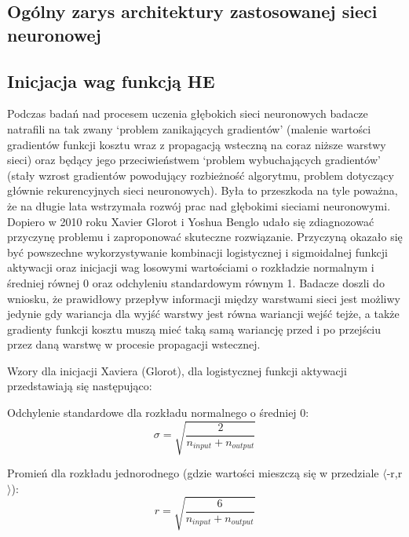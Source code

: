 \documentclass[a4paper,11pt]{article}
\begin{document}
    \subsection{Ogólny zarys architektury zastosowanej sieci neuronowej}

    \subsection{Inicjacja wag funkcją HE}

    Podczas badań nad procesem uczenia głębokich sieci neuronowych badacze natrafili na tak zwany `problem zanikających gradientów' (malenie wartości gradientów funkcji kosztu wraz z propagacją wsteczną na coraz niższe warstwy sieci) oraz będący jego przeciwieństwem `problem wybuchających gradientów' (stały wzrost gradientów powodujący rozbieżność algorytmu, problem dotyczący głównie rekurencyjnych sieci neuronowych)\cite{UczenieMaszynowe2018}. Była to przeszkoda na tyle poważna, że na długie lata wstrzymała rozwój prac nad głębokimi sieciami neuronowymi. Dopiero w 2010 roku Xavier Glorot i Yoshua Benglo udało się zdiagnozować przyczynę problemu i zaproponować skuteczne rozwiązanie. Przyczyną okazało się być powszechne wykorzystywanie kombinacji logistycznej i sigmoidalnej funkcji aktywacji oraz inicjacji wag losowymi wartościami o rozkładzie normalnym i średniej równej 0 oraz odchyleniu standardowym równym 1. Badacze doszli do wniosku, że prawidłowy przepływ informacji między warstwami sieci jest możliwy jedynie gdy wariancja dla wyjść warstwy jest równa wariancji wejść tejże, a także gradienty funkcji kosztu muszą mieć taką samą wariancję przed i po przejściu przez daną warstwę w procesie propagacji wstecznej\cite{UnderstandingTheDifficultyOfTrainingDeepFeedforwardNeuralNetworks2010}.

    \bigskip

    Wzory dla inicjacji Xaviera (Glorot), dla logistycznej funkcji aktywacji przedstawiają się następująco:

    \bigskip

    Odchylenie standardowe dla rozkładu normalnego o średniej 0: \\
    \begin{equation}
        \label{equ:std_dev_xavier}
        \sigma = \sqrt{\frac{2}{n_{input} + n_{output}}}
    \end{equation}

    \smallskip

    Promień dla rozkładu jednorodnego (gdzie wartości mieszczą się w przedziale $\langle$-r,r$\rangle$): \\
    \begin{equation}
        \label{equ:radius_xavier}
        r = \sqrt{\frac{6}{n_{input} + n_{output}}}
    \end{equation}
\end{document}
